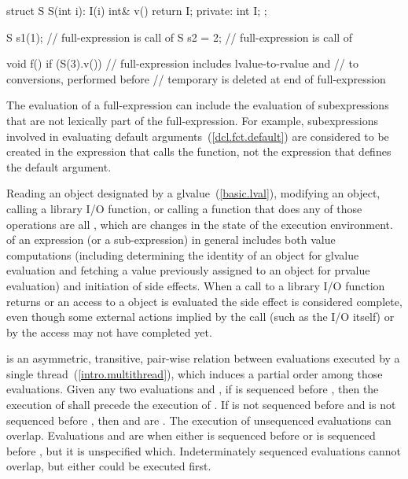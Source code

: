 \enterexample
\begin{codeblock}
struct S {
  S(int i): I(i) { }
  int& v() { return I; }
private:
  int I;
};

 S s1(1);           // full-expression is call of 
 S s2 = 2;          // full-expression is call of 

void f() {
  if (S(3).v())     // full-expression includes lvalue-to-rvalue and
                    //  to  conversions, performed before
                    // temporary is deleted at end of full-expression
  { }
}
\end{codeblock}
\exitexample

\pnum
\enternote The evaluation of a full-expression can include the
evaluation of subexpressions that are not lexically part of the
full-expression. For example, subexpressions involved in evaluating
default arguments~(\ref{dcl.fct.default}) are considered to
be created in the expression that calls the function, not the expression
that defines the default argument. \exitnote

\pnum
{}%
Reading an object designated by a 
glvalue~(\ref{basic.lval}), modifying an object, calling a library I/O
function, or calling a function that does any of those operations are
all
, which are changes in the state of the execution
environment.  of an expression (or a
sub-expression) in general includes both value computations (including
determining the identity of an object for glvalue evaluation and fetching
a value previously assigned to an object for prvalue evaluation) and
initiation of side effects. When a call to a library I/O function
returns or an access to a  object is evaluated the side
effect is considered complete, even though some external actions implied
by the call (such as the I/O itself) or by the  access
may not have completed yet.

\pnum
{} is an asymmetric, transitive, pair-wise relation between
evaluations executed by a single thread~(\ref{intro.multithread}), which induces
a partial order among those evaluations. Given any two evaluations  and
, if  is sequenced before , then the execution of
 shall precede the execution of . If  is not sequenced
before  and  is not sequenced before , then  and
 are . \enternote The execution of unsequenced
evaluations can overlap. \exitnote Evaluations  and  are
 when either  is sequenced before
 or  is sequenced before , but it is unspecified which.
\enternote Indeterminately sequenced evaluations cannot overlap, but either
could be executed first. \exitnote

